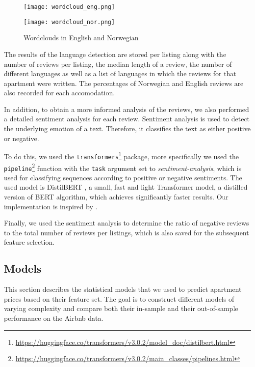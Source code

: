 \begin{figure}[t]
  \centering
  \begin{minipage}{6.7cm}
    \texttt{[image: wordcloud\_eng.png]}
  \end{minipage}
  \begin{minipage}{6.7cm}
    \texttt{[image: wordcloud\_nor.png]}
  \end{minipage}
  \caption{Wordclouds in English and Norwegian}
  \label{fig:wordclouds}
\end{figure}

The results of the language detection are stored per listing along with the number of reviews per listing, the median length of a review, the number of different languages as well as a list of languages in which the reviews for that apartment were written.
The percentages of Norwegian and English reviews are also recorded for each accomodation.

In addition, to obtain a more informed analysis of the reviews, we also performed a detailed sentiment analysis for each review.
Sentiment analysis is used to detect the underlying emotion of a text.
Therefore, it classifies the text as either positive or negative.

To do this, we used the \texttt{transformers}\footnote{\url{https://huggingface.co/transformers/v3.0.2/model_doc/distilbert.html}} package, more specifically we used the \texttt{pipeline}\footnote{\url{https://huggingface.co/transformers/v3.0.2/main_classes/pipelines.html}} function with the \texttt{task} argument set to \textit{sentiment-analysis}, which is used for classifying sequences according to positive or negative sentiments.
The used model is DistilBERT \citep{sanh2020}, a small, fast and light Transformer model, a distilled version of BERT \citep{devlin2019} algorithm, which achieves significantly faster results.
Our implementation is inspired by \citep{selvaraj2020}.

Finally, we used the sentiment analysis to determine the ratio of negative reviews to the total number of reviews per listings, which is also saved for the subsequent feature selection.


\subsection{Models}

This section describes the statistical models that we used to predict apartment prices based on their feature set.
The goal is to construct different models of varying complexity and compare both their in-sample and their out-of-sample performance on the Airbnb data.


